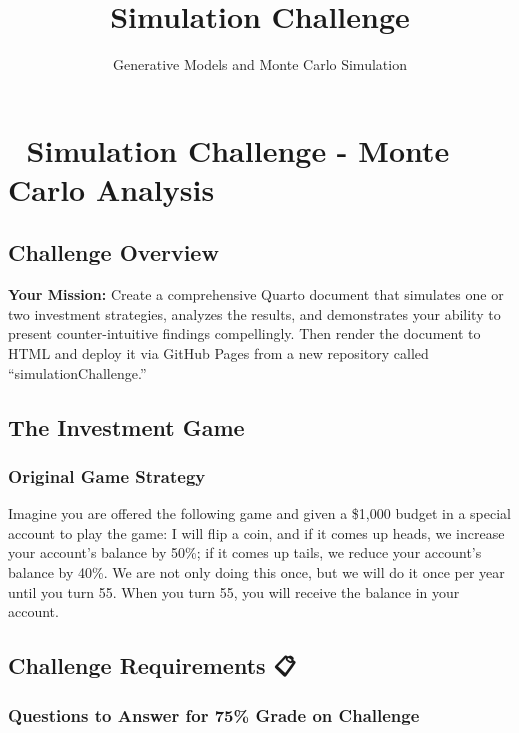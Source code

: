 \documentclass[
  letterpaper,
  DIV=11,
  numbers=noendperiod]{scrartcl}
\title{Simulation Challenge}
\subtitle{Generative Models and Monte Carlo Simulation}
\author{}
\date{}
\begin{document}
\maketitle


\section{🎲 Simulation Challenge - Monte Carlo
Analysis}\label{simulation-challenge---monte-carlo-analysis}

\subsection{Challenge Overview}\label{challenge-overview}

\textbf{Your Mission:} Create a comprehensive Quarto document that
simulates one or two investment strategies, analyzes the results, and
demonstrates your ability to present counter-intuitive findings
compellingly. Then render the document to HTML and deploy it via GitHub
Pages from a new repository called ``simulationChallenge.''

\subsection{The Investment Game 🎯}\label{the-investment-game}

\subsubsection{Original Game Strategy}\label{original-game-strategy}

Imagine you are offered the following game and given a \$1,000 budget in
a special account to play the game: I will flip a coin, and if it comes
up heads, we increase your account's balance by 50\%; if it comes up
tails, we reduce your account's balance by 40\%. We are not only doing
this once, but we will do it once per year until you turn 55. When you
turn 55, you will receive the balance in your account.

\subsection{Challenge Requirements 📋}\label{challenge-requirements}

\subsubsection{Questions to Answer for 75\% Grade on
Challenge}\label{questions-to-answer-for-75-grade-on-challenge}
\end{document}
